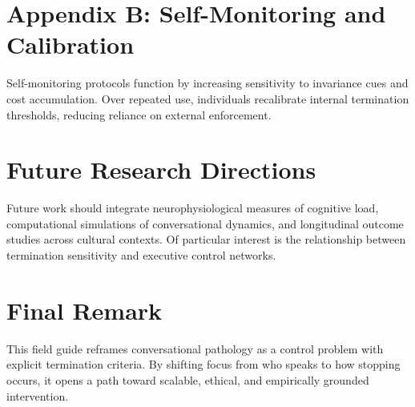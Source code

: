 \documentclass[12pt]{article}
\theoremstyle{remark}
\begin{document}
\section{Appendix B: Self-Monitoring and Calibration}

Self-monitoring protocols function by increasing sensitivity to invariance cues and cost accumulation. Over repeated use, individuals recalibrate internal termination thresholds, reducing reliance on external enforcement.

\section{Future Research Directions}

Future work should integrate neurophysiological measures of cognitive load, computational simulations of conversational dynamics, and longitudinal outcome studies across cultural contexts. Of particular interest is the relationship between termination sensitivity and executive control networks.

\section{Final Remark}

This field guide reframes conversational pathology as a control problem with explicit termination criteria. By shifting focus from who speaks to how stopping occurs, it opens a path toward scalable, ethical, and empirically grounded intervention.
\end{document}
